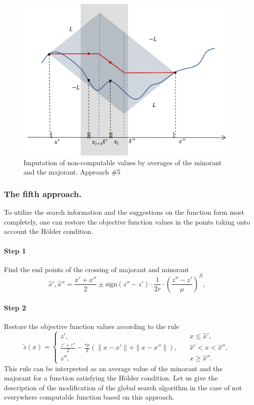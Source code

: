 \documentclass[runningheads]{llncs}
\begin{document}
\begin{figure}
\includegraphics[width=\textwidth]{fig5.png}
\caption{Imputation of non-computable values by averages of the minorant and the majorant. Approach \#5} \label{fig5}
\end{figure}

\subsubsection{The fifth approach.} To utilize the search information and the suggestions on the function form most completely, one can restore the objective function values in the points taking onto account the H{\"o}lder condition.
\paragraph{Step 1} Find the end points of the crossing of majorant and minorant
\begin{equation}\label{eq18} 
\hat{x}',\hat{x}''=\frac {x'+x''}{2}\pm \text{sign}(z''-z')\cdot \frac {1}{2r} \cdot {\left(\frac {z''-z'}{\mu}\right)}^N,
\end{equation}
\paragraph{Step 2} Restore the objective function values according to the rule
\begin{equation}\label{eq19} 
\tilde{z}(x)=
  \begin{cases}
    z', & {\quad x \leq \hat{x}',}\\
    \frac {z'+z''}{2}- \frac {r \mu}{2} (\| x - x' \| + \| x - x'' \|), & {\quad \hat{x}' < x < \hat{x}'',}\\
    z'',  & {\quad x \geq \hat{x}''.}
  \end{cases}
\end{equation}
This rule can be interpreted as an average value of the minorant and the majorant for a function satisfying the H{\"o}lder condition. Let us give the description of the modification of the global search algorithm in the case of not everywhere computable function based on this approach.
\end{document}
